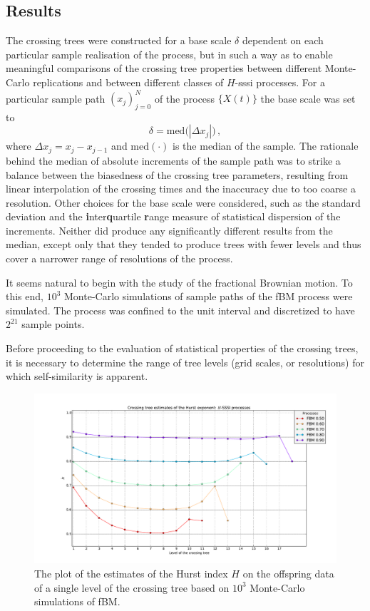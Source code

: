 \documentclass[a4paper]{article}
\begin{document}
\subsection{Results} %
\label{sub:results}

The crossing trees were constructed for a base scale $\delta$ dependent on each particular
sample realisation of the process, but in such a way as to enable meaningful comparisons
of the crossing tree properties between different Monte-Carlo replications and between
different classes of $H$-sssi processes. For a particular sample path $(x_j)_{j=0}^N$
of the process $\{X(t)\}$ the base scale was set to
\[ \delta = \text{med}\bigl( |\Delta x_j| \bigr) \,, \]
where $\Delta x_j = x_j - x_{j-1}$ and $\text{med}(\cdot)$ is the median of the
sample. The rationale behind the median of absolute increments of the sample path
was to strike a balance between the biasedness of the crossing tree parameters,
resulting from linear interpolation of the crossing times and the inaccuracy due to
too coarse a resolution. Other choices for the base scale were considered, such
as the standard deviation and the \textbf{i}nter\textbf{q}uartile \textbf{r}ange
measure of statistical dispersion of the increments. Neither did produce any significantly
different results from the median, except only that they tended to produce trees with
fewer levels and thus cover a narrower range of resolutions of the process.

It seems natural to begin with the study of the fractional Brownian motion. To this end,
$10^3$ Monte-Carlo simulations of sample paths of the fBM process were simulated. The
process was confined to the unit interval and discretized to have $2^{21}$ sample points.

Before proceeding to the evaluation of statistical properties of the crossing trees,
it is necessary to determine the range of tree levels (grid scales, or resolutions)
for which self-similarity is apparent.
\begin{figure}[htb]\begin{center}
    \includegraphics[width=6in]{images/fbm_fig_05_med_1000-21}
    \caption{The plot of the estimates of the Hurst index $H$ on the offspring data
    of a single level of the crossing tree based on $10^3$ Monte-Carlo simulations of
    fBM.}
\label{fig:fbm_hurst_crossing_tree}
\end{center}\end{figure}
\end{document}
